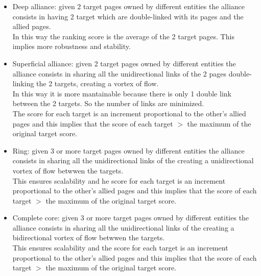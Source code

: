 \begin{itemize}
    \item Deep alliance: given 2 target pages owned by different entities
    the alliance consists in having 2 target which are double-linked
    with its pages and the allied pages.\\ In this way the ranking score
    is the average of the 2 target pages. This implies more robustness
    and stability.
    \item Superficial alliance: given 2 target pages owned by different
    entities the alliance consists in sharing all the unidirectional links of the
    2 pages double-linking the 2 targets, creating a vortex of flow.\\
    In this way it is more mantainable because there is only 1 double
    link between the 2 targets. So the number of links are minimized.\\
    The score for each target is an increment proportional to the other's
    allied pages and this implies that the score of each target $>$ the
    maximum of the original target score.
    \item Ring: given 3 or more target pages owned by different
    entities the alliance consists in sharing all the unidirectional links of the
    creating a unidirectional vortex of flow betwwen the targets.\\
    This ensures scalability and he score for each target is an increment proportional to the other's
    allied pages and this implies that the score of each target $>$ the
    maximum of the original target score.
    \item Complete core: given 3 or more target pages owned by different
    entities the alliance consists in sharing all the unidirectional links of the
    creating a bidirectional vortex of flow betwwen the targets.\\
    This ensures scalability and the score for each target is an increment proportional to the other's
    allied pages and this implies that the score of each target $>$ the
    maximum of the original target score.
\end{itemize}
